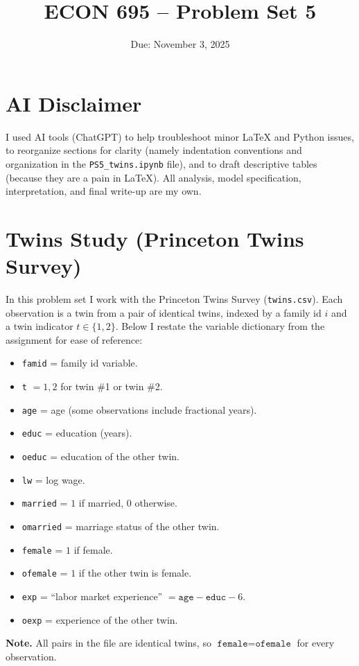 \documentclass[12pt]{article}
\title{ECON 695 -- Problem Set 5}
\date{Due: November 3, 2025}
\begin{document}
\maketitle

\section*{AI Disclaimer}
I used AI tools (ChatGPT) to help troubleshoot minor LaTeX and Python issues, to reorganize sections for clarity (namely indentation conventions and organization in the \verb+PS5_twins.ipynb+ file), and to draft descriptive tables (because they are a pain in LaTeX). All analysis, model specification, interpretation, and final write-up are my own.

\section*{Twins Study (Princeton Twins Survey)}
In this problem set I work with the Princeton Twins Survey (\texttt{twins.csv}). Each observation is a twin from a pair of identical twins, indexed by a family id \(i\) and a twin indicator \(t\in\{1,2\}\). Below I restate the variable dictionary from the assignment for ease of reference:
\begin{itemize}[leftmargin=1.25em]
  \item \texttt{famid} = family id variable.
  \item \texttt{t} \(=1,2\) for twin \#1 or twin \#2.
  \item \texttt{age} = age (some observations include fractional years).
  \item \texttt{educ} = education (years).
  \item \texttt{oeduc} = education of the other twin.
  \item \texttt{lw} = log wage.
  \item \texttt{married} = \(1\) if married, \(0\) otherwise.
  \item \texttt{omarried} = marriage status of the other twin.
  \item \texttt{female} = \(1\) if female.
  \item \texttt{ofemale} = \(1\) if the other twin is female.
  \item \texttt{exp} = ``labor market experience'' \(=\texttt{age}-\texttt{educ}-6\).
  \item \texttt{oexp} = experience of the other twin.
\end{itemize}
\noindent\textbf{Note.} All pairs in the file are identical twins, so \(\texttt{female}=\texttt{ofemale}\) for every observation.
\end{document}
